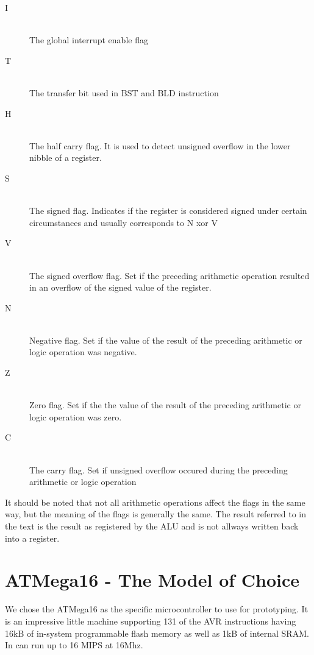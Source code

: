 \begin{description}
\item[I] \hfill \\
The global interrupt enable flag
\item[T] \hfill \\ 
The transfer bit used in BST and BLD instruction %
\item[H] \hfill \\ 
The half carry flag. It is used to detect unsigned overflow in the 
lower nibble of a register.
\item[S] \hfill \\ 
The signed flag. Indicates if the register is considered signed under 
certain circumstances and usually corresponds to N xor V
\item[V] \hfill \\
The signed overflow flag. Set if the preceding arithmetic operation
resulted in an overflow of the signed value of the register.
\item[N] \hfill \\ 
Negative flag. Set if the value of the result of the preceding arithmetic or logic operation was negative.
\item[Z] \hfill \\ 
Zero flag. Set if the the value of the result of the preceding arithmetic or logic operation was zero.
\item[C] \hfill \\ 
The carry flag. Set if unsigned overflow occured during the preceding arithmetic or logic
operation
\end{description}

It should be noted that not all arithmetic operations affect the flags in the same
way, but the meaning of the flags is generally the same. The result referred to in the
text is the result as registered by the \ac{ALU}\cite[p.9]{ATMegaDS} and is not allways written back into
a register.

\section{ATMega16 - The Model of Choice}

We chose the ATMega16 \cite{ATMegaDS} as the specific microcontroller to use for prototyping. It is an 
impressive little machine supporting 131 of the AVR instructions
having 16kB of in-system programmable flash memory as well as 1kB of 
internal SRAM. In can run up to 16 MIPS at 16Mhz. \cite[p.1]{ATMegaDS}

